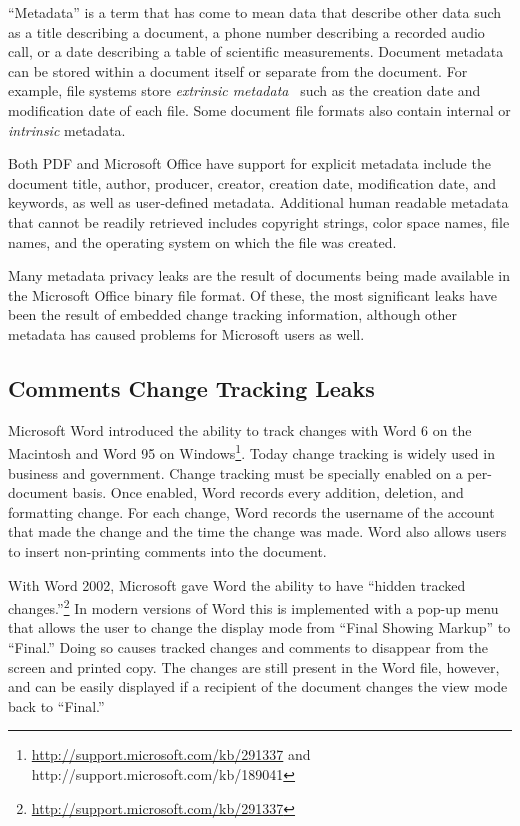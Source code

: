 ``Metadata'' is a term that has come to mean data that describe other
data such as a title describing a document, a phone number describing
a recorded audio call, or a date describing a table of scientific
measurements. Document metadata can be stored within a document itself
or separate from the document. For example, file systems store
\emph{extrinsic metadata}~\cite{garfinkel:ascription} such as the
creation date and modification date of each file. Some document file
formats also contain internal or \emph{intrinsic} metadata.

Both PDF and Microsoft Office have support for explicit metadata
include the document title, author, producer, creator, creation date,
modification date, and keywords, as well as user-defined
metadata. Additional human readable metadata that cannot be readily
retrieved includes copyright strings, color space names, file names,
and the operating system on which the file was created.

Many metadata privacy leaks are the result of documents being made
available in the Microsoft Office binary file format. Of these, the
most significant leaks have been the result of embedded change
tracking information, although other metadata has caused problems for
Microsoft users as well.


\subsection{Comments Change Tracking Leaks}

Microsoft Word introduced the ability to track changes with Word 6 on
the Macintosh and Word 95 on
Windows\footnote{\url{http://support.microsoft.com/kb/291337}
  and http://support.microsoft.com/kb/189041}. Today change
tracking is widely used in business and government. Change
tracking must be specially enabled on a per-document basis. Once
enabled, Word records every addition, deletion, and formatting
change. For each change, Word records the username of the account that
made the change and the time the change was made. Word also allows
users to insert non-printing comments into the document.

With Word 2002, Microsoft gave Word the ability to have ``hidden
tracked
changes.''\footnote{\url{http://support.microsoft.com/kb/291337}} In
modern versions of Word this is implemented with a pop-up menu that
allows the user to change the display mode from ``Final Showing
Markup'' to ``Final.'' Doing so causes tracked changes and comments to
disappear from the screen and printed copy. The changes are still
present in the Word file, however, and can be easily displayed if a
recipient of the document  changes the view mode back to ``Final.''

